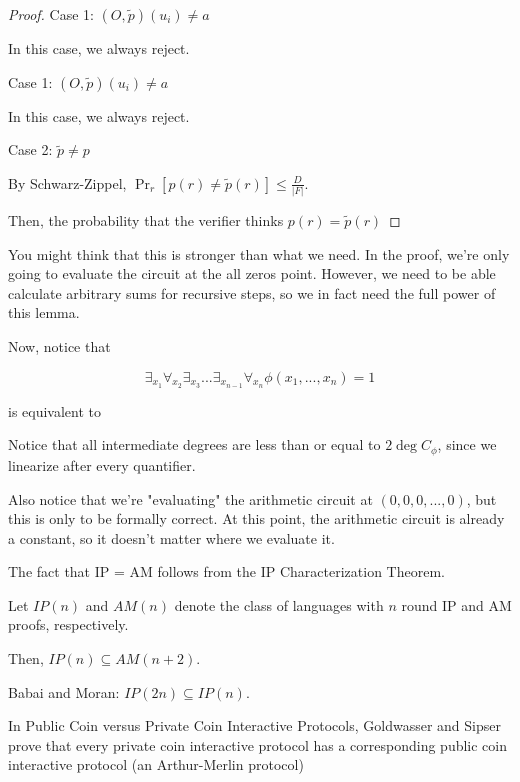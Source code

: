 \documentclass{article}
\theoremstyle{definition}
\begin{document}
\begin{proof}
    Case 1: $(O, \tilde{p})(u_{i}) \neq a$
    
    In this case, we always reject.

    Case 1: $(O, \tilde{p})(u_{i}) \neq a$
    
    In this case, we always reject.
    
    Case 2: $\tilde{p} \neq p$

    By Schwarz-Zippel, $\Pr_{r}[p(r) \neq \tilde{p}(r)] \leq \frac{D}{\lvert F \rvert}$.

    Then, the probability that the verifier thinks $p(r) = \tilde{p}(r)$
\end{proof}

You might think that this is stronger than what we need. In the proof, we're only going to evaluate the circuit 
at the all zeros point. However, we need to be able calculate arbitrary sums for recursive steps, so we in fact
need the full power of this lemma.

Now, notice that

\[ \exists_{x_{1}} \forall_{x_{2}} \exists_{x_{3}}... \exists_{x_{n-1}} \forall_{x_{n}} \phi(x_{1},...,x_{n}) = 1 \]

is equivalent to


Notice that all intermediate degrees are less than or equal to $2 \deg{C_{\phi}}$, since we linearize after
every quantifier.

Also notice that we're "evaluating" the arithmetic circuit at $(0,0,0,...,0)$, but this is only
to be formally correct. At this point, the arithmetic circuit is already a constant, so it doesn't
matter where we evaluate it.


The fact that IP = AM follows from the IP Characterization Theorem.

Let $IP(n)$ and $AM(n)$ denote the class of languages with $n$ round IP and AM proofs, respectively.

Then, $IP(n) \subseteq AM(n+2)$.

Babai and Moran: $IP(2n) \subseteq IP(n)$.

In Public Coin versus Private Coin Interactive Protocols, Goldwasser and Sipser prove that
every private coin interactive protocol has a corresponding public coin interactive protocol
(an Arthur-Merlin protocol) 
\end{document}
